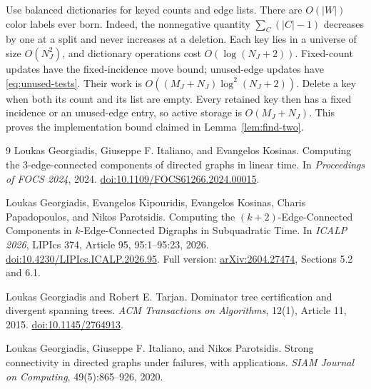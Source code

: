\documentclass[11pt]{article}
\theoremstyle{definition}
\theoremstyle{remark}
\begin{document}
Use balanced dictionaries for keyed counts and edge lists. There are \(O(|W|)\) color labels ever born. Indeed, the nonnegative quantity \(\sum_C(|C|-1)\) decreases by one at a split and never increases at a deletion. Each key lies in a universe of size \(O(N_J^2)\), and dictionary operations cost \(O(\log(N_J+2))\). Fixed-count updates have the fixed-incidence move bound; unused-edge updates have \eqref{eq:unused-tests}. Their work is \(O((M_J+N_J)\log^2(N_J+2))\). Delete a key when both its count and its list are empty. Every retained key then has a fixed incidence or an unused-edge entry, so active storage is \(O(M_J+N_J)\). This proves the implementation bound claimed in Lemma~\ref{lem:find-two}.

\begin{thebibliography}{9}
Loukas Georgiadis, Giuseppe F. Italiano, and Evangelos Kosinas.
\newblock Computing the 3-edge-connected components of directed graphs in linear time.
\newblock In \emph{Proceedings of FOCS 2024}, 2024.
\newblock \href{https://doi.org/10.1109/FOCS61266.2024.00015}{doi:10.1109/FOCS61266.2024.00015}.

Loukas Georgiadis, Evangelos Kipouridis, Evangelos Kosinas, Charis Papadopoulos, and Nikos Parotsidis.
\newblock Computing the \((k+2)\)-Edge-Connected Components in \(k\)-Edge-Connected Digraphs in Subquadratic Time.
\newblock In \emph{ICALP 2026}, LIPIcs 374, Article 95, 95:1--95:23, 2026.
\newblock \href{https://doi.org/10.4230/LIPIcs.ICALP.2026.95}{doi:10.4230/LIPIcs.ICALP.2026.95}.
\newblock Full version: \href{https://arxiv.org/abs/2604.27474}{arXiv:2604.27474}, Sections 5.2 and 6.1.

Loukas Georgiadis and Robert E. Tarjan.
\newblock Dominator tree certification and divergent spanning trees.
\newblock \emph{ACM Transactions on Algorithms}, 12(1), Article 11, 2015.
\newblock \href{https://doi.org/10.1145/2764913}{doi:10.1145/2764913}.

Loukas Georgiadis, Giuseppe F. Italiano, and Nikos Parotsidis.
\newblock Strong connectivity in directed graphs under failures, with applications.
\newblock \emph{SIAM Journal on Computing}, 49(5):865--926, 2020.
\end{thebibliography}
\end{document}
